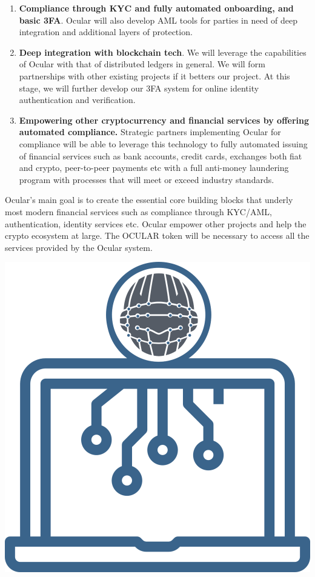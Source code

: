 \documentclass[a4paper]{article}
\begin{document}
\begin{enumerate}
\item \textbf{Compliance through KYC and fully automated onboarding, and basic 3FA}. Ocular will also develop AML tools for parties in need of deep integration and additional layers of protection. 

\item \textbf{Deep integration with blockchain tech}. We will leverage the capabilities of Ocular with that of distributed ledgers in general. We will form partnerships with other existing projects if it betters our project. At this stage, we will further develop our 3FA system for online identity authentication and verification. 

\item \textbf{Empowering other cryptocurrency and financial services by offering automated compliance.} Strategic partners implementing Ocular for compliance will be able to leverage this technology to fully automated issuing of financial services such as bank accounts, credit cards, exchanges both fiat and crypto, peer-to-peer payments etc with a full anti-money laundering program with processes that will meet or exceed industry standards. 


\end{enumerate}

Ocular's main goal is to create the essential core building blocks that underly most modern financial services such as compliance through KYC/AML, authentication, identity services etc. Ocular empower other projects and help the crypto ecosystem at large. The OCULAR token will be necessary to access all the services provided by the Ocular system.

\clearpage

\centerline{\includegraphics[width=1.0\textwidth]{ocular-crypto}}
\end{document}
